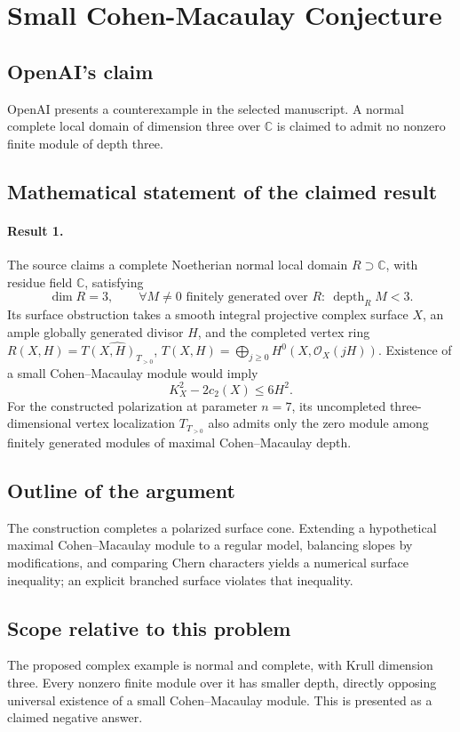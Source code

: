 \documentclass[11pt]{article}
\begin{document}
\section*{Small Cohen-Macaulay Conjecture}

\subsection{OpenAI's claim}
OpenAI presents a counterexample in the selected manuscript. A normal complete local domain of dimension three over $\mathbb C$ is claimed to admit no nonzero finite module of depth three.

\subsection{Mathematical statement of the claimed result}
\paragraph{Result 1.} The source claims a complete Noetherian normal local domain \(R\supset\mathbb C\), with residue field \(\mathbb C\), satisfying
\[
 \dim R=3,\qquad
 \forall M\ne0\text{ finitely generated over }R:\ \operatorname{depth}_RM<3.
\]
Its surface obstruction takes a smooth integral projective complex surface \(X\), an ample globally generated divisor \(H\), and the completed vertex ring \(R(X,H)=\widehat{T(X,H)_{T_{>0}}}\), \(T(X,H)=\bigoplus_{j\ge0}H^0(X,\mathcal O_X(jH))\). Existence of a small Cohen--Macaulay module would imply
\[
 K_X^2-2c_2(X)\le6H^2.
\]
For the constructed polarization at parameter \(n=7\), its uncompleted three-dimensional vertex localization \(T_{T_{>0}}\) also admits only the zero module among finitely generated modules of maximal Cohen--Macaulay depth.

\subsection{Outline of the argument}
The construction completes a polarized surface cone. Extending a hypothetical maximal Cohen--Macaulay module to a regular model, balancing slopes by modifications, and comparing Chern characters yields a numerical surface inequality; an explicit branched surface violates that inequality.

\subsection{Scope relative to this problem}
The proposed complex example is normal and complete, with Krull dimension three. Every nonzero finite module over it has smaller depth, directly opposing universal existence of a small Cohen--Macaulay module. This is presented as a claimed negative answer.
\end{document}
